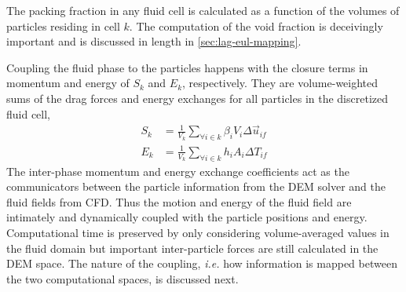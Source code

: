 The packing fraction in any fluid cell is calculated as a function of the volumes of particles residing in cell $k$. The computation of the void fraction is deceivingly important and is discussed in length in \cref{sec:lag-eul-mapping}.

Coupling the fluid phase to the particles happens with the closure terms in momentum and energy of $S_k$ and $E_k$, respectively. They are volume-weighted sums of the drag forces and energy exchanges for all particles in the discretized fluid cell,
\begin{subequations}\label{eq:cfd-sources}
\begin{align}
	S_k &= \frac{1}{V_k}\sum_{\forall i \in k} \beta_i V_i \Delta \vec{u}_{if} \label{eq:cfd-mom-source}\\
	E_k &= \frac{1}{V_k}\sum_{\forall i \in k} h_i A_i \Delta T_{if}
\end{align}
\end{subequations}
The inter-phase momentum and energy exchange coefficients act as the communicators between the particle information from the DEM solver and the fluid fields from CFD. Thus the motion and energy of the fluid field are intimately and dynamically coupled with the particle positions and energy. Computational time is preserved by only considering volume-averaged values in the fluid domain but important inter-particle forces are still calculated in the DEM space. The nature of the coupling, \textit{i.e.} how information is mapped between the two computational spaces, is discussed next.%





